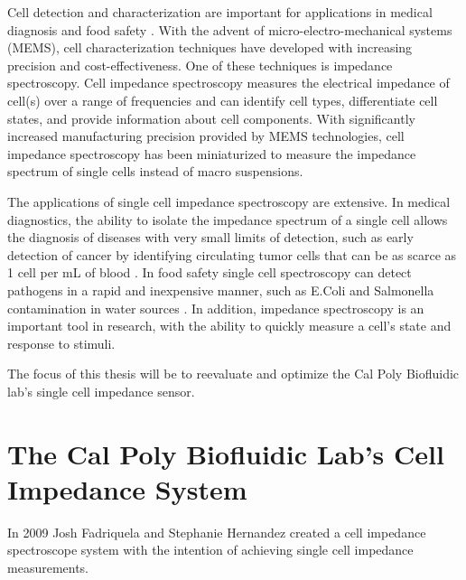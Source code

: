 \par Cell detection and characterization are important for applications in medical diagnosis and food safety \cite{mansor}. With the advent of micro-electro-mechanical systems (MEMS), cell characterization techniques have developed with increasing precision and cost-effectiveness. One of these techniques is impedance spectroscopy. Cell impedance spectroscopy measures the electrical impedance of cell(s) over a range of frequencies and can identify cell types, differentiate cell states, and provide information about cell components. With significantly increased manufacturing precision provided by MEMS technologies, cell impedance spectroscopy has been miniaturized to measure the impedance spectrum of single cells instead of macro suspensions. 

\par The applications of single cell impedance spectroscopy are extensive. In medical diagnostics, the ability to isolate the impedance spectrum of a single cell allows the diagnosis of diseases with very small limits of detection, such as early detection of cancer by identifying circulating tumor cells that can be as scarce as 1 cell per mL of blood \cite{mansor-1}. In food safety single cell spectroscopy can detect pathogens in a rapid and inexpensive manner, such as E.Coli and Salmonella contamination in water sources \cite{mansor-3}. In addition, impedance spectroscopy is an important tool in research, with the ability to quickly measure a cell's state and response to stimuli. 

\par The focus of this thesis will be to reevaluate and optimize the Cal Poly Biofluidic lab's single cell impedance sensor.

\section[Cal Poly's IS System]{The Cal Poly Biofluidic Lab's Cell Impedance System}

\par In 2009 Josh Fadriquela and Stephanie Hernandez created a cell impedance spectroscope system with the intention of achieving single cell impedance measurements. 


